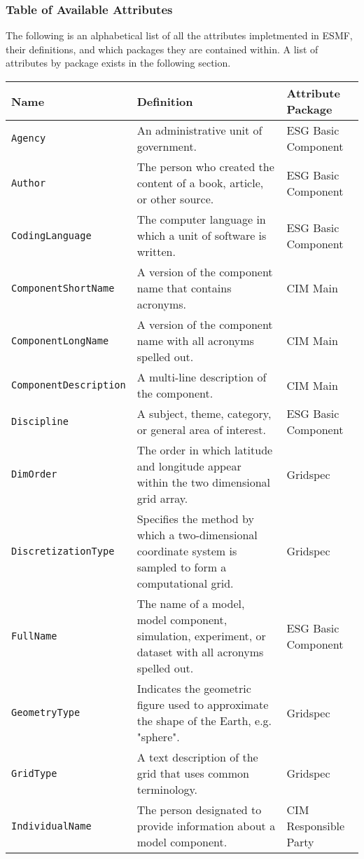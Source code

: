 \subsubsection{Table of Available Attributes}

The following is an alphabetical list of all the attributes impletmented in ESMF, their definitions, and which packages they are contained within. A list of attributes by package exists in the following section. 


\begin{tabular}{|p{8cm}|p{20cm}|p{10cm}}
     \hline\hline
     {\bf Name} & {\bf Definition} & {\bf Attribute Package}\\
     \hline\hline
     {\tt Agency} & An administrative unit of government.& ESG Basic Component\\
     {\tt Author} & The person who created the content of a book, article, or other source. & ESG Basic Component\\
     {\tt CodingLanguage} & The computer language in which a unit of software is written. & ESG Basic Component\\
     {\tt ComponentShortName} & A version of the component name that contains acronyms. & CIM Main\\
     {\tt ComponentLongName} & A version of the component name with all acronyms spelled out. & CIM Main\\
     {\tt ComponentDescription} & A multi-line description of the component. & CIM Main \\
     {\tt Discipline} & A subject, theme, category, or general area of interest.& ESG Basic Component \\
     {\tt DimOrder} & The order in which latitude and longitude appear within the two dimensional grid array. & Gridspec\\ 
     {\tt DiscretizationType} & Specifies the method by which a two-dimensional coordinate system is sampled to form a computational grid.& Gridspec \\
     {\tt FullName} & The name of a model, model component, simulation, experiment, or dataset with all acronyms spelled out.& ESG Basic Component\\
     {\tt GeometryType} & Indicates the geometric figure used to approximate the shape of the Earth, e.g. "sphere". & Gridspec \\
     {\tt GridType} & A text description of the grid that uses common terminology. & Gridspec \\
     {\tt IndividualName} & The person designated to provide information about a model component. & CIM Responsible Party\\

\end{tabular}
